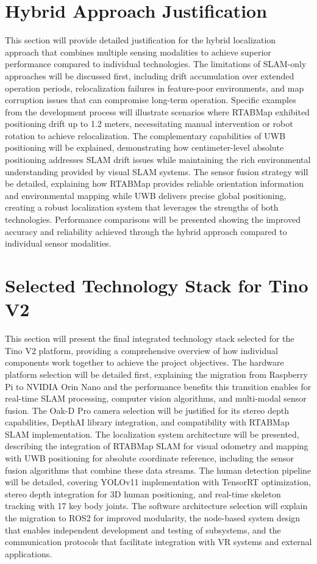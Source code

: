 \section{Hybrid Approach Justification}
This section will provide detailed justification for the hybrid localization approach that combines multiple sensing modalities to achieve superior performance compared to individual technologies. The limitations of SLAM-only approaches will be discussed first, including drift accumulation over extended operation periods, relocalization failures in feature-poor environments, and map corruption issues that can compromise long-term operation. Specific examples from the development process will illustrate scenarios where RTABMap exhibited positioning drift up to 1.2 meters, necessitating manual intervention or robot rotation to achieve relocalization. The complementary capabilities of UWB positioning will be explained, demonstrating how centimeter-level absolute positioning addresses SLAM drift issues while maintaining the rich environmental understanding provided by visual SLAM systems. The sensor fusion strategy will be detailed, explaining how RTABMap provides reliable orientation information and environmental mapping while UWB delivers precise global positioning, creating a robust localization system that leverages the strengths of both technologies. Performance comparisons will be presented showing the improved accuracy and reliability achieved through the hybrid approach compared to individual sensor modalities.

\section{Selected Technology Stack for Tino V2}
This section will present the final integrated technology stack selected for the Tino V2 platform, providing a comprehensive overview of how individual components work together to achieve the project objectives. The hardware platform selection will be detailed first, explaining the migration from Raspberry Pi to NVIDIA Orin Nano and the performance benefits this transition enables for real-time SLAM processing, computer vision algorithms, and multi-modal sensor fusion. The Oak-D Pro camera selection will be justified for its stereo depth capabilities, DepthAI library integration, and compatibility with RTABMap SLAM implementation. The localization system architecture will be presented, describing the integration of RTABMap SLAM for visual odometry and mapping with UWB positioning for absolute coordinate reference, including the sensor fusion algorithms that combine these data streams. The human detection pipeline will be detailed, covering YOLOv11 implementation with TensorRT optimization, stereo depth integration for 3D human positioning, and real-time skeleton tracking with 17 key body joints. The software architecture selection will explain the migration to ROS2 for improved modularity, the node-based system design that enables independent development and testing of subsystems, and the communication protocols that facilitate integration with VR systems and external applications.
